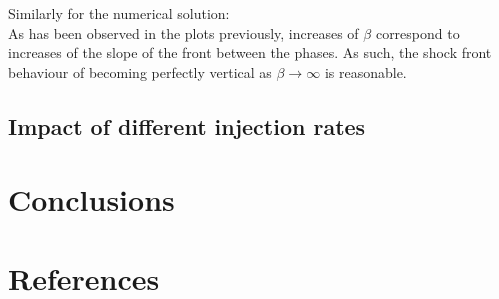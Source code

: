 \documentclass[11pt]{article}
\begin{document}
Similarly for the numerical solution:\\


As has been observed in the plots previously, increases of $\beta$ correspond to increases of the slope of the front between the phases. As such, the shock front behaviour of becoming perfectly vertical as $\beta\to\infty$ is reasonable.

\subsection{Impact of different injection rates}
\smallbreak
\section{Conclusions}

\smallbreak
\section{References}

\newpage
\end{document}
